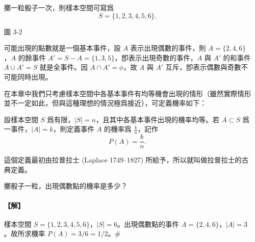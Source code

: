\noindent
\begin{minipage}[c]{0.58\textwidth}
\begin{discussion}\label{disc:b5-3-1}
擲一粒骰子一次，則樣本空間可寫爲
\[
S=\{1, 2, 3, 4, 5, 6\}.
\]
\end{discussion}
\end{minipage}\hfill
\begin{minipage}[c]{0.38\textwidth}
\centering
{}
\par\vspace{0.2em}
{\small 圖 3-2}
\end{minipage}

\medskip
可能出現的點數就是一個基本事件，設 $A$ 表示出現偶數的事件，則 $A=\{2, 4, 6\}$，$A$ 的餘事件 $A'=S-A=\{1, 3, 5\}$，卽表示出現奇數的事件，$A$ 與 $A'$ 的和事件 $A \cup A' = S$ 就是全事件。因 $A \cap A' = \phi$，故 $A$ 與 $A'$ 互斥，卽表示偶數與奇數不可能同時出現。

在本章中我們只考慮樣本空間中各基本事件有均等機會出現的情形（雖然實際情形並不一定如此，但與這種理想的情況極爲接近），可定義機率如下：

\medskip
\begin{definition*}
設樣本空間 $S$ 爲有限，$|S|=n$，且其中各基本事件出現的機率均等。若 $A \subset S$ 爲一事件，$|A|=k$，則定義事件 $A$ 的機率爲 $\frac{k}{n}$，記作
\[
P(A) = \frac{k}{n}.
\]
\end{definition*}
這個定義最初由拉普拉士 (Laplace 1749--1827) 所給予，所以就叫做拉普拉士的古典定義。

\medskip
\begin{example}\label{ex:b5-3-1}
擲骰子一粒，出現偶數點的機率是多少？
\end{example}
\paragraph{【解】}
樣本空間 $S=\{1, 2, 3, 4, 5, 6\}$，$|S|=6$。出現偶數點的事件 $A=\{2, 4, 6\}$，$|A|=3$。故所求機率 $P(A) = 3/6 = 1/2$。\hfill $\#$

